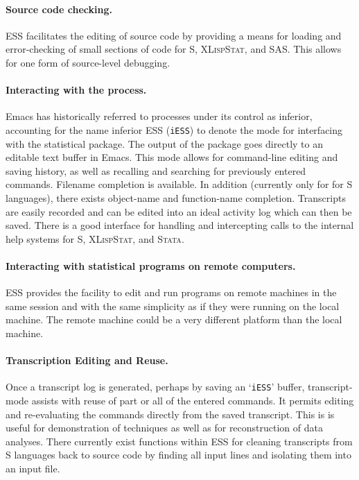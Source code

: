 \documentclass{article}
\newcommand*{\XLispStat}{\textsc{XLispStat}}
\newcommand*{\Stata}{\textsc{Stata}}
\newcommand{\stexttt}[1]{{\small\texttt{#1}}}
\newcommand{\file}[1]{`\stexttt{#1}'}
\begin{document}
\paragraph{Source code checking.}
ESS facilitates the editing of source code by providing a means
for loading and error-checking of small sections of code for S,
\XLispStat, and SAS.  This allows for one form of source-level
debugging.

\paragraph{Interacting with the process.}
Emacs has historically referred to processes under its control as
inferior, accounting for the name inferior ESS (\stexttt{iESS}) to
denote the mode for interfacing with the statistical package.  The
output of the package goes directly to an editable text buffer in
Emacs.  This mode allows for command-line editing and saving history,
as well as recalling and searching for previously entered commands.
Filename completion is available.  In addition (currently only for for
S languages), there exists object-name and function-name completion.
Transcripts are easily recorded and can be edited into an ideal
activity log which can then be saved.  There is a good interface for
handling and intercepting calls to the internal help systems for S,
\XLispStat, and \Stata.

\paragraph{Interacting with statistical programs on remote computers.}
ESS provides the facility to edit and run programs on remote machines
in the same session and with the same simplicity as if they were
running on the local machine.  The remote machine could be a very
different platform than the local machine.

\paragraph{Transcription Editing and Reuse.}
Once a transcript log is generated, perhaps by saving an \file{iESS}
buffer, transcript-mode assists with reuse of part or all of the
entered commands.  It permits editing and re-evaluating the commands
directly from the saved transcript.  This is is useful for
demonstration of techniques as well as for reconstruction of data
analyses.  There currently exist functions within ESS for cleaning
transcripts from S languages back to source code by finding all input
lines and isolating them into an input file.
\end{document}
